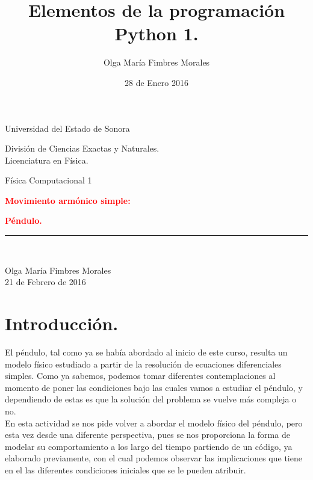 \documentclass[12pt]{article}
\title{Elementos de la programación Python 1.}
\author{\textcolor{JungleGreen}{Olga María Fimbres Morales}}
\date{28 de Enero 2016}
\begin{document}
\begin{titlepage}

\begin{center}
\begin{large}
Universidad del Estado de Sonora\\
\end{large}
\vspace*{0.15in}
División de Ciencias Exactas y Naturales.\\
\vspace*{0.15in}
Licenciatura en Física. \\
\vspace*{0.6in}
\begin{large}
Física Computacional 1\\
\end{large}
\vspace*{0.2in}
\begin{Large}
\textbf{{\textcolor{Red}{Movimiento armónico simple:}}} \\
\end{Large}

\begin{Large}
\textbf{{\textcolor{Red}{Péndulo.}}} \\
\end{Large}

\rule{80mm}{0.1mm}\\
\vspace*{0.1in}
\begin{large}
{\textcolor{JungleGreen}{Olga María Fimbres Morales}}\\
21 de Febrero de 2016\\
\end{large}
\end{center}
\end{titlepage}

\pagebreak
\section*{Introducción.}
El péndulo, tal como ya se había abordado al inicio de este curso, resulta un modelo físico estudiado a partir de la resolución de ecuaciones diferenciales simples. Como ya sabemos, podemos tomar diferentes contemplaciones al momento de poner las condiciones bajo las cuales vamos a estudiar el péndulo, y dependiendo de estas es que la solución del problema se vuelve más compleja o no.\\
En esta actividad se nos pide volver a abordar el modelo físico del péndulo, pero esta vez desde una diferente perspectiva, pues se nos proporciona la forma de modelar su comportamiento a los largo del tiempo partiendo de un código, ya elaborado previamente, con el cual podemos observar las implicaciones que tiene en el las diferentes condiciones iniciales que se le pueden atribuir.
 
\end{document}
